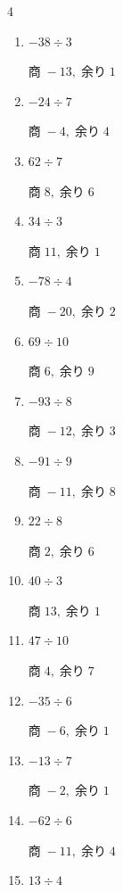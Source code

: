 \begin{multicols}{4}
\begin{enumerate}
        $商\; 6,\; 余り\; 3$

  \item $-38 \div 3$

        $商\; -13,\; 余り\; 1$

  \item $-24 \div 7$

        $商\; -4,\; 余り\; 4$

  \item $62 \div 7$

        $商\; 8,\; 余り\; 6$

  \item $34 \div 3$

        $商\; 11,\; 余り\; 1$

\columnbreak %

  \item $-78 \div 4$

        $商\; -20,\; 余り\; 2$

  \item $69 \div 10$

        $商\; 6,\; 余り\; 9$

  \item $-93 \div 8$

        $商\; -12,\; 余り\; 3$

  \item $-91 \div 9$

        $商\; -11,\; 余り\; 8$

  \item $22 \div 8$

        $商\; 2,\; 余り\; 6$

  \item $40 \div 3$

        $商\; 13,\; 余り\; 1$

  \item $47 \div 10$

        $商\; 4,\; 余り\; 7$

  \item $-35 \div 6$

        $商\; -6,\; 余り\; 1$

  \item $-13 \div 7$

        $商\; -2,\; 余り\; 1$

  \item $-62 \div 6$

        $商\; -11,\; 余り\; 4$

  \item $13 \div 4$


\end{enumerate}
\end{multicols}
